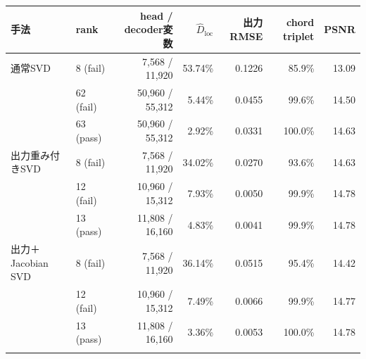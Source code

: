 \begin{tabular}{llrrrrr}
\toprule
手法 & rank & head / decoder変数 & $\widehat D_{\mathrm{loc}}$ & 出力RMSE & chord triplet & PSNR \\
\midrule
通常SVD & 8 (fail) & 7,568 / 11,920 & 53.74\% & 0.1226 & 85.9\% & 13.09 \\
 & 62 (fail) & 50,960 / 55,312 & 5.44\% & 0.0455 & 99.6\% & 14.50 \\
 & 63 (pass) & 50,960 / 55,312 & 2.92\% & 0.0331 & 100.0\% & 14.63 \\
\addlinespace
出力重み付きSVD & 8 (fail) & 7,568 / 11,920 & 34.02\% & 0.0270 & 93.6\% & 14.63 \\
 & 12 (fail) & 10,960 / 15,312 & 7.93\% & 0.0050 & 99.9\% & 14.78 \\
 & 13 (pass) & 11,808 / 16,160 & 4.83\% & 0.0041 & 99.9\% & 14.78 \\
\addlinespace
出力＋Jacobian SVD & 8 (fail) & 7,568 / 11,920 & 36.14\% & 0.0515 & 95.4\% & 14.42 \\
 & 12 (fail) & 10,960 / 15,312 & 7.49\% & 0.0066 & 99.9\% & 14.77 \\
 & 13 (pass) & 11,808 / 16,160 & 3.36\% & 0.0053 & 100.0\% & 14.78 \\
\addlinespace
\bottomrule
\end{tabular}
